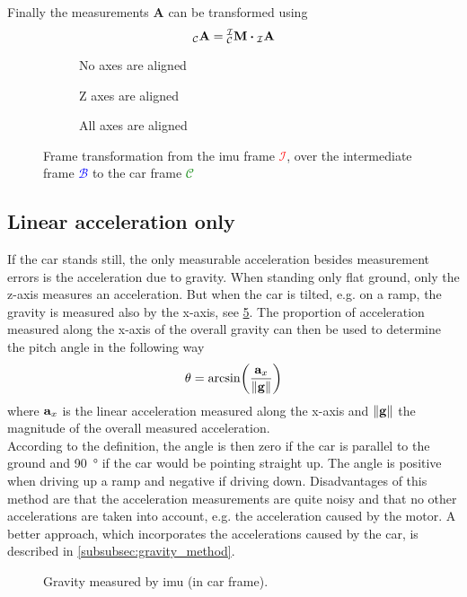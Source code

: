 Finally the measurements $\mathbf{A}$ can be transformed using
\begin{equation}
	\vincs{A}{c} = \mtf{i}{c} \vdot \vincs{A}{i}
\end{equation}
\begin{figure}[htb]
	\centering
	\begin{subfigure}[b]{0.3\textwidth}
		\centering
		
		\caption{No axes are aligned}
		\label{fig:tikz_frame_transformation_init}
	\end{subfigure}
	\hfill
	\begin{subfigure}[b]{0.3\textwidth}
		\centering
		
		\caption{Z axes are aligned}
		\label{fig:tikz_frame_transformation_intermediate}
	\end{subfigure}
	\hfill
	\begin{subfigure}[b]{0.3\textwidth}
		\centering
		
		\caption{All axes are aligned}
		\label{fig:tikz_frame_transformation_final}
	\end{subfigure}
	\caption[Frame transformation]{Frame transformation from the \gls{imu} frame \textcolor{red}{$\mathcal{I}$}, over the intermediate frame \textcolor{blue}{$\mathcal{B}$} to the car frame \textcolor{green}{$\mathcal{C}$}}
	\label{fig:tikz_frame_transformation}
\end{figure}


\subsection{Linear acceleration only}
\label{ssec:linear_acceleration_only}
If the car stands still, the only measurable acceleration besides measurement errors is the acceleration due to gravity.
When standing only flat ground, only the z-axis measures an acceleration.
But when the car is tilted, e.g. on a ramp, the gravity is measured also by the x-axis, see \cref{fig:tikz_car_gravity}.
The proportion of acceleration measured along the x-axis of the overall gravity can then be used to determine the pitch angle in the following way
\begin{equation}
	\theta = \arcsin(\frac{\vb{a}_x}{\norm{\vb{g}}})
\end{equation}
where $\vb{a}_x$ is the linear acceleration measured along the x-axis and $\norm{\vb{g}}$ the magnitude of the overall measured acceleration.\\
According to the definition, the angle is then zero if the car is parallel to the ground and \SI{90}{\degree} if the car would be pointing straight up.
The angle is positive when driving up a ramp and negative if driving down.
Disadvantages of this method are that the acceleration measurements are quite noisy and that no other accelerations are taken into account, e.g. the acceleration caused by the motor.
A better approach, which incorporates the accelerations caused by the car, is described in \cref{subsubsec:gravity_method}.
\begin{figure}[htpb]
	\centering
	
	\caption{Gravity measured by \acrshort{imu} (in car frame).}
	\label{fig:tikz_car_gravity}
\end{figure}

